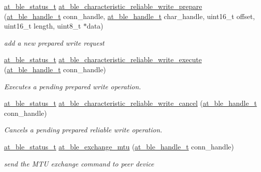 \begin{DoxyCompactItemize}
\mbox{\hyperlink{group__error__codes__group_ga3b1db9b95feb157b3c188ca27fe76988}{at\+\_\+ble\+\_\+status\+\_\+t}} \mbox{\hyperlink{group__gatt__client__group_gaeaad17e6de538db2f9db638a0fef0310}{at\+\_\+ble\+\_\+characteristic\+\_\+reliable\+\_\+write\+\_\+prepare}} (\mbox{\hyperlink{at__ble__api_8h_abd23646d0c662860741f787efc8456f2}{at\+\_\+ble\+\_\+handle\+\_\+t}} conn\+\_\+handle, \mbox{\hyperlink{at__ble__api_8h_abd23646d0c662860741f787efc8456f2}{at\+\_\+ble\+\_\+handle\+\_\+t}} char\+\_\+handle, uint16\+\_\+t offset, uint16\+\_\+t length, uint8\+\_\+t $\ast$data)
\begin{DoxyCompactList}\small\item\em add a new prepared write request \end{DoxyCompactList}\item 
\mbox{\hyperlink{group__error__codes__group_ga3b1db9b95feb157b3c188ca27fe76988}{at\+\_\+ble\+\_\+status\+\_\+t}} \mbox{\hyperlink{group__gatt__client__group_ga9a3982336528fec5ec5c59f8937075cc}{at\+\_\+ble\+\_\+characteristic\+\_\+reliable\+\_\+write\+\_\+execute}} (\mbox{\hyperlink{at__ble__api_8h_abd23646d0c662860741f787efc8456f2}{at\+\_\+ble\+\_\+handle\+\_\+t}} conn\+\_\+handle)
\begin{DoxyCompactList}\small\item\em Executes a pending prepared write operation. \end{DoxyCompactList}\item 
\mbox{\hyperlink{group__error__codes__group_ga3b1db9b95feb157b3c188ca27fe76988}{at\+\_\+ble\+\_\+status\+\_\+t}} \mbox{\hyperlink{group__gatt__client__group_ga7d89d0a874b956a99356ca8aa7764ff8}{at\+\_\+ble\+\_\+characteristic\+\_\+reliable\+\_\+write\+\_\+cancel}} (\mbox{\hyperlink{at__ble__api_8h_abd23646d0c662860741f787efc8456f2}{at\+\_\+ble\+\_\+handle\+\_\+t}} conn\+\_\+handle)
\begin{DoxyCompactList}\small\item\em Cancels a pending prepared reliable write operation. \end{DoxyCompactList}\item 
\mbox{\hyperlink{group__error__codes__group_ga3b1db9b95feb157b3c188ca27fe76988}{at\+\_\+ble\+\_\+status\+\_\+t}} \mbox{\hyperlink{group__gatt__client__group_ga26fc3ac24ee5eb33237dfba027818238}{at\+\_\+ble\+\_\+exchange\+\_\+mtu}} (\mbox{\hyperlink{at__ble__api_8h_abd23646d0c662860741f787efc8456f2}{at\+\_\+ble\+\_\+handle\+\_\+t}} conn\+\_\+handle)
\begin{DoxyCompactList}\small\item\em send the M\+TU exchange command to peer device \end{DoxyCompactList}\end{DoxyCompactItemize}


